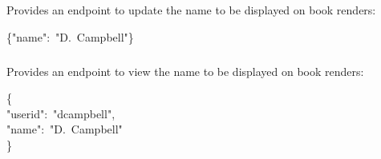 \documentclass[onecolumn, draftclsnofoot, 10pt, compsoc]{IEEEtran}
\begin{document}

\subsection{}\label{sec-accountsmyaccount}%

\subsubsection{}\label{sec-post-accountsmyaccount}%

\noindent Provides an endpoint to update the name to be displayed on book renders:%
\begin{mdpre}%
\noindent\{"name":~"D.~Campbell"\}%
\end{mdpre}
\subsubsection{}\label{sec-get-accountsmyaccount}%

\noindent Provides an endpoint to view the name to be displayed on book renders:%
\begin{mdpre}%
\noindent\{\\
"userid":~"dcampbell",\\
"name":~"D.~Campbell"\\
\}%
\end{mdpre}%
\end{document}
